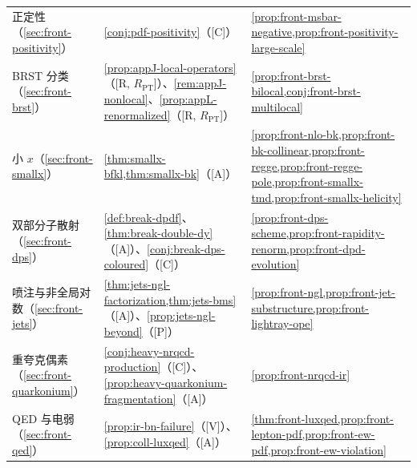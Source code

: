 \begin{table}[htbp]
\begin{tabularx}{\textwidth}{@{}p{2.5cm}>{\raggedright\arraybackslash}X>{\raggedright\arraybackslash}X@{}}
正定性（\cref{sec:front-positivity}） & \cref{conj:pdf-positivity}（[C]） & \cref{prop:front-msbar-negative,prop:front-positivity-large-scale} \\
BRST 分类（\cref{sec:front-brst}） & \cref{prop:appJ-local-operators}（[R, $R_{\mathrm{PT}}$]）、\cref{rem:appJ-nonlocal}、\cref{prop:appL-renormalized}（[R, $R_{\mathrm{PT}}$]） & \cref{prop:front-brst-bilocal,conj:front-brst-multilocal} \\
小 $x$（\cref{sec:front-smallx}） & \cref{thm:smallx-bfkl,thm:smallx-bk}（[A]） & \cref{prop:front-nlo-bk,prop:front-bk-collinear,prop:front-regge,prop:front-regge-pole,prop:front-smallx-tmd,prop:front-smallx-helicity} \\
双部分子散射（\cref{sec:front-dps}） & \cref{def:break-dpdf}、\cref{thm:break-double-dy}（[A]）、\cref{conj:break-dps-coloured}（[C]） & \cref{prop:front-dps-scheme,prop:front-rapidity-renorm,prop:front-dpd-evolution} \\
喷注与非全局对数（\cref{sec:front-jets}） & \cref{thm:jets-ngl-factorization,thm:jets-bms}（[A]）、\cref{prop:jets-ngl-beyond}（[P]） & \cref{prop:front-ngl,prop:front-jet-substructure,prop:front-lightray-ope} \\
重夸克偶素（\cref{sec:front-quarkonium}） & \cref{conj:heavy-nrqcd-production}（[C]）、\cref{prop:heavy-quarkonium-fragmentation}（[A]） & \cref{prop:front-nrqcd-ir} \\
QED 与电弱（\cref{sec:front-qed}） & \cref{prop:ir-bn-failure}（[V]）、\cref{prop:coll-luxqed}（[A]） & \cref{thm:front-luxqed,prop:front-lepton-pdf,prop:front-ew-pdf,prop:front-ew-violation} \\
\bottomrule
\end{tabularx}
\end{table}

